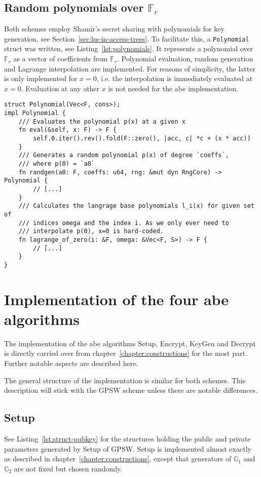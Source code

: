 \subsection{Random polynomials over $\mathbb{F}_r$}

Both schemes employ Shamir's secret sharing with polynomials for key generation, see Section~\ref{sec:lss-in-access-trees}.
To facilitate this, a \texttt{Polynomial} struct was written, see Listing~\ref{lst:polynomials}.
It represents a polynomial over $\mathbb{F}_r$ as a vector of coefficients from $\mathbb{F}_r$.
Polynomial evaluation, random generation and Lagrange interpolation are implemented.
For reasons of simplicity, the latter is only implemented for $x=0$, i.e. the interpolation is immediately evaluated at $x=0$.
Evaluation at any other $x$ is not needed for the \acrshort{abe} implementation.

\begin{lstlisting}[float=h,caption={Implementation of polynomials over $\mathbb{F}_r$},label={lst:polynomials}]
struct Polynomial(Vec<F, cons>);
impl Polynomial {
    /// Evaluates the polynomial p(x) at a given x
    fn eval(&self, x: F) -> F {
        self.0.iter().rev().fold(F::zero(), |acc, c| *c + (x * acc))
    }
    /// Generates a random polynomial p(x) of degree `coeffs`,
    /// where p(0) = `a0`
    fn randgen(a0: F, coeffs: u64, rng: &mut dyn RngCore) -> Polynomial {
        // [...]
    }
    /// Calculates the langrage base polynomials l_i(x) for given set of
    /// indices omega and the index i. As we only ever need to
    /// interpolate p(0), x=0 is hard-coded.
    fn lagrange_of_zero(i: &F, omega: &Vec<F, S>) -> F {
        // [...]
    }
}
\end{lstlisting}

\section{Implementation of the four \acrshort*{abe} algorithms}\label{sec:abe-algs-impl}

The implementation of the \acrshort{abe} algorithms Setup, Encrypt, KeyGen and Decrypt is directly carried over from chapter~\ref{chapter:constructions} for the most part.
Further notable aspects are described here.

The general structure of the implementation is similar for both schemes. 
This description will stick with the GPSW scheme unless there are notable differences.

\subsection{Setup}
See Listing~\ref{lst:struct-pubkey} for the structures holding the public and private parameters generated by Setup of GPSW.
Setup is implemented almost exactly as described in chapter~\ref{chapter:constructions}, except that generators of $\mathbb{G}_1$ and $\mathbb{G}_2$ are not fixed but chosen randomly.

